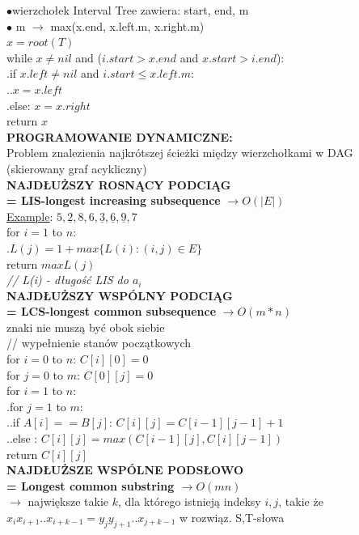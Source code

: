 \documentclass[8pt,a3paper]{article}
\begin{document}
\begin{multicols*}{3}
	$\bullet$wierzchołek Interval Tree zawiera: start, end, m \\ 
	$\bullet$ m $\to$ max(x.end, x.left.m, x.right.m) \\
	$x = root(T)$ \\
	while $x \neq nil$ and ($i.start > x.end$ and $x.start>i.end$): \\
	.\quad if $x.left \neq nil$ and $i.start \leq x.left.m$: \\
	.\quad .\quad $x = x.left$ \\
	.\quad else: $x = x.right$ \\
	return $x$ \\
	\textbf{PROGRAMOWANIE DYNAMICZNE:} \\
	Problem znalezienia najkrótszej ścieżki między wierzchołkami w DAG (skierowany graf acykliczny)\\
	\textbf{NAJDŁUŻSZY ROSNĄCY PODCIĄG \\ = LIS-longest increasing subsequence} $\to O(|E|)$ \\
	\underline{Example}: $5, \underline{2}, 8,6, \underline{3}, \underline{6}, \underline{9},7$\\
	for $i=1$ to $n$: \\
	.\quad $L(j) = 1 + max \{ L(i): (i,j) \in E\}$ \\
	return $maxL(j)$ \\
	\textit{ // L(i) - długość LIS do $a_{i}$} \\
	\textbf{NAJDŁUŻSZY WSPÓLNY PODCIĄG \\ = LCS-longest common subsequence} $\to O(m*n)$ \\
	znaki nie muszą być obok siebie \\
	// wypełnienie stanów początkowych \\
	 for $i = 0$ to $n$: $C[i][0] = 0$  \\
	 for $j = 0$ to $m$: $C[0][j] = 0$\\
	 for $i = 1$ to $n$: \\
	 .\quad for $j = 1$ to $m$:\\
	 .\quad .\quad if $A[i] == B[j]$: $C[i][j] = C[i-1][j-1] + 1 $  \\
	 .\quad .\quad else : $C[i][j] = max(C[i-1][j], C[i][j-1])$ \\
	 return $C[i][j]$ \\
	 \textbf{NAJDŁUŻSZE WSPÓLNE PODSŁOWO \\ = Longest common substring $\to O(mn)$}\\
	 $\to$ największe takie $k$, dla którego istnieją indeksy $i,j$, takie że $x_{i}x_{i+1}..x_{i+k-1}=y_{j}y_{j+1}..x_{j+k-1}$ w rozwiąz. S,T-słowa\\

\end{multicols*}
\end{document}
